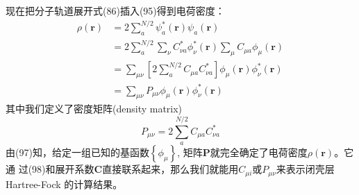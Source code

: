 \documentclass[]{article}
\begin{document}
现在把分子轨道展开式(86)插入(95)得到电荷密度：
\begin{align}
	\rho(\mathbf{r})
	&=2\sum\limits_a^{N/2}\psi^*_a(\mathbf{r})\psi_a(\mathbf{r})\nonumber\\
	&=2\sum\limits_a^{N/2}\sum\limits_{\nu}C^*_{\nu a}\phi^*_{\nu}(\mathbf{r})\sum\limits_{\mu}C_{\mu a}\phi_{\mu}(\mathbf{r})\nonumber\\
	&=\sum\limits_{\mu\nu}\left[ 2\sum\limits_a^{N/2}C_{\mu a}C^*_{\nu a}\right] \phi_{\mu}(\mathbf{r})\phi^*_{\nu}(\mathbf{r})\nonumber\\
	&=\sum\limits_{\mu\nu}P_{\mu\nu}\phi_{\mu}(\mathbf{r})\phi^*_{\nu}(\mathbf{r})
\end{align}
其中我们定义了密度矩阵(density matrix)
\begin{equation}
	P_{\mu\nu}=2\sum\limits_a^{N/2}C_{\mu a}C^*_{\nu a}
\end{equation}
由(97)知，给定一组已知的基函数$\left\lbrace\phi_{\mu}\right\rbrace  $, 矩阵$\mathbf{P}$就完全确定了电荷密度$\rho(\mathbf{r})$。它通
过(98)和展开系数$\mathbf{C}$直接联系起来，那么我们就能用$C_{\mu i}$或$P_{\mu \nu}$来表示闭壳层 Hartree-Fock 的计算结果。
\end{document}
